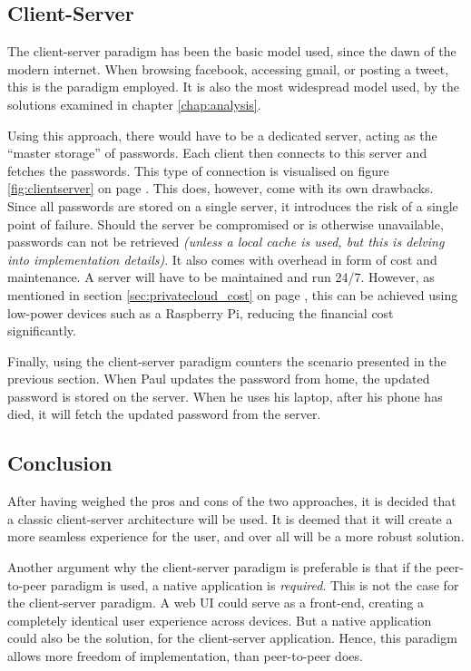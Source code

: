 		\subsection{Client-Server}
			The client-server paradigm has been the basic model used, since the dawn of the modern internet. When browsing facebook, accessing gmail, or posting a tweet, this is the paradigm employed. It is also the most widespread model used, by the solutions examined in chapter \ref{chap:analysis}.

			Using this approach, there would have to be a dedicated server, acting as the ``master storage'' of passwords. Each client then connects to this server and fetches the passwords. This type of connection is visualised on figure \ref{fig:clientserver} on page \pageref{fig:clientserver}. This does, however, come with its own drawbacks. Since all passwords are stored on a single server, it introduces the risk of a single point of failure. Should the server be compromised or is otherwise unavailable, passwords can not be retrieved \emph{(unless a local cache is used, but this is delving into implementation details)}. It also comes with overhead in form of cost and maintenance. A server will have to be maintained and run 24/7. However, as mentioned in section \ref{sec:privatecloud_cost} on page \pageref{sec:privatecloud_cost}, this can be achieved using low-power devices such as a Raspberry Pi, reducing the financial cost significantly.

			Finally, using the client-server paradigm counters the scenario presented in the previous section. When Paul updates the password from home, the updated password is stored on the server. When he uses his laptop, after his phone has died, it will fetch the updated password from the server.


		\subsection{Conclusion}
			After having weighed the pros and cons of the two approaches, it is decided that a classic client-server architecture will be used. It is deemed that it will create a more seamless experience for the user, and over all will be a more robust solution.

			Another argument why the client-server paradigm is preferable is that if the peer-to-peer paradigm is used, a native application is \emph{required}. This is not the case for the client-server paradigm. A web UI could serve as a front-end, creating a completely identical user experience across devices. But a native application could also be the solution, for the client-server application. Hence, this paradigm allows more freedom of implementation, than peer-to-peer does.

